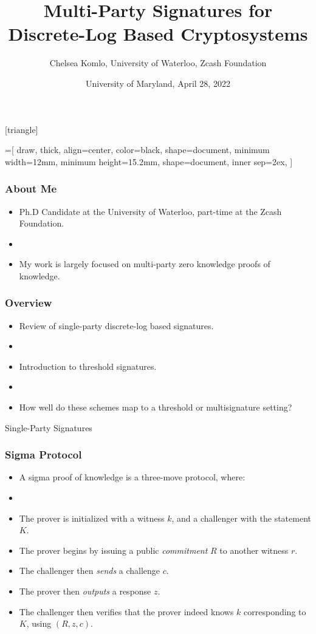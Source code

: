 \documentclass[hyperref={pdfpagelabels=true},table,dvipsnames,14pt,aspectratio=169]{beamer}
\title[Signatures for Discrete Logarithm Based Cryptosystems]{Multi-Party Signatures for \\ Discrete-Log Based Cryptosystems}
\author{Chelsea Komlo, University of Waterloo, Zcash Foundation}
\date[April 2022]{ University of Maryland, April 28, 2022}
\begin{document}
[triangle]

=[%
draw,
thick,
align=center,
color=black,
shape=document,
minimum width=12mm,
minimum height=15.2mm,
shape=document,
inner sep=2ex,
]

\begin{frame}
        \thispagestyle{empty}
        \maketitle
\end{frame}

\begin{frame}
  \frametitle{About Me}

  \begin{itemize}
    \item<1-> Ph.D Candidate at the University of Waterloo, part-time at the Zcash Foundation. 
    \item[]
    \item<1-> My work is largely focused on multi-party zero knowledge proofs of knowledge. 
  \end{itemize}
\end{frame}

\begin{frame}
  \frametitle{Overview}

  \begin{itemize}
    \item<1-> Review of single-party discrete-log based signatures.
    \item[]
    \item<2-> Introduction to threshold signatures. 
    \item[]
    \item<3-> How well do these schemes map to a threshold or multisignature setting? 
  \end{itemize}
\end{frame}

\begin{frame}
  \huge 
  Single-Party Signatures 
\end{frame}

\begin{frame}
  \frametitle{Sigma Protocol}

  \begin{itemize}
    \item<1-> A sigma proof of knowledge is a three-move protocol, where:
    \item[]
    \item<2->[1.] The prover is initialized with a witness $k$, and a challenger with the statement $K$. 
    \item<3->[2.] The prover begins by issuing a public \emph{commitment} $R$ to another witness $r$.
    \item<4->[3.] The challenger then \emph{sends} a challenge $c$. 
    \item<5->[4.] The prover then \emph{outputs} a response $z$. 
    \item<6->[5.] The challenger then verifies that the prover indeed knows $k$ corresponding to $K$, using $(R, z, c)$.
  \end{itemize}
\end{frame}
\end{document}
